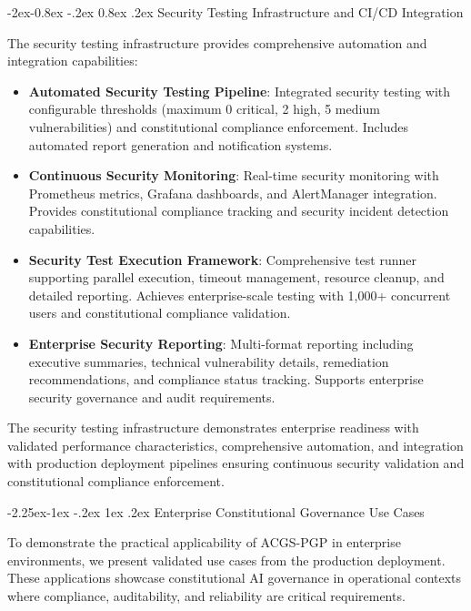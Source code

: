 \documentclass[manuscript,screen,9pt]{acmart}
\makeatletter
\renewcommand\subsection{\@startsection{subsection}{2}{\z@}%
  {-2.25ex\@plus -1ex \@minus -.2ex}%
  {1ex \@plus .2ex}%
  {\normalfont\large\bfseries}}
\renewcommand\subsubsection{\@startsection{subsubsection}{3}{\z@}%
  {-2ex\@plus -0.8ex \@minus -.2ex}%
  {0.8ex \@plus .2ex}%
  {\normalfont\normalsize\bfseries}}
\makeatother
\begin{document}
\subsubsection{Security Testing Infrastructure and CI/CD Integration}
\label{subsubsec:security_infrastructure}

The security testing infrastructure provides comprehensive automation and integration capabilities:

\begin{itemize}[leftmargin=*,itemsep=2pt,parsep=1pt]
	\item \textbf{Automated Security Testing Pipeline}: Integrated security testing with configurable thresholds (maximum 0 critical, 2 high, 5 medium vulnerabilities) and constitutional compliance enforcement. Includes automated report generation and notification systems.

	\item \textbf{Continuous Security Monitoring}: Real-time security monitoring with Prometheus metrics, Grafana dashboards, and AlertManager integration. Provides constitutional compliance tracking and security incident detection capabilities.

	\item \textbf{Security Test Execution Framework}: Comprehensive test runner supporting parallel execution, timeout management, resource cleanup, and detailed reporting. Achieves enterprise-scale testing with 1,000+ concurrent users and constitutional compliance validation.

	\item \textbf{Enterprise Security Reporting}: Multi-format reporting including executive summaries, technical vulnerability details, remediation recommendations, and compliance status tracking. Supports enterprise security governance and audit requirements.
\end{itemize}

The security testing infrastructure demonstrates enterprise readiness with validated performance characteristics, comprehensive automation, and integration with production deployment pipelines ensuring continuous security validation and constitutional compliance enforcement.

\subsection{Enterprise Constitutional Governance Use Cases}
\label{subsec:enterprise_use_cases}

To demonstrate the practical applicability of ACGS-PGP in enterprise environments, we present validated use cases from the production deployment. These applications showcase constitutional AI governance in operational contexts where compliance, auditability, and reliability are critical requirements.
\end{document}
